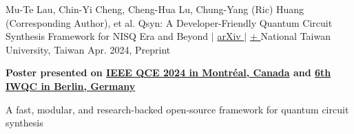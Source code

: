 \begin{cventries}
    \cventry
        {Mu-Te Lau, Chin-Yi Cheng, Cheng-Hua Lu, Chung-Yang (Ric) Huang (Corresponding Author), et al.}
        {Qsyn: A Developer-Friendly Quantum Circuit Synthesis Framework for NISQ Era and Beyond 
        $|$ 
        \href{https://arxiv.org/abs/2405.07197}{arXiv \faLink} 
        $|$ 
        \href{https://github.com/DVLab-NTU/qsyn}{+ \raisebox{0.1em}{\textbf{$\star$}}}}
        {National Taiwan University, Taiwan}
        {Apr. 2024, Preprint}
        {
            \begin{cvitems}
               \item \textcolor{awesome}{\textbf{Poster presented on \href{https://qce.quantum.ieee.org/2024/posters-program/}{IEEE QCE 2024 in Montr\'eal, Canada} and \href{https://quantum-compilers.github.io/iwqc2024/posters.html}{6th IWQC in Berlin, Germany}}}
               \item A fast, modular, and research-backed open-source framework for quantum circuit synthesis
            \end{cvitems}
        }
        
\end{cventries}